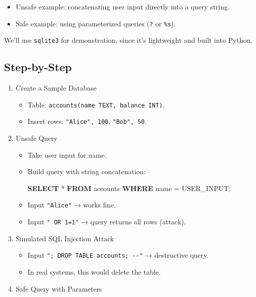 \documentclass[
  letterpaper,
  DIV=11,
  numbers=noendperiod]{scrreprt}
\newenvironment{Shaded}{\begin{snugshade}}{\end{snugshade}}
\newcommand{\KeywordTok}[1]{\textcolor[rgb]{0.00,0.23,0.31}{\textbf{#1}}}
\newcommand{\NormalTok}[1]{\textcolor[rgb]{0.00,0.23,0.31}{#1}}
\newcommand{\OperatorTok}[1]{\textcolor[rgb]{0.37,0.37,0.37}{#1}}
\newcommand{\StringTok}[1]{\textcolor[rgb]{0.13,0.47,0.30}{#1}}
\providecommand{\tightlist}{%
  \setlength{\itemsep}{0pt}\setlength{\parskip}{0pt}}
\begin{document}
\begin{itemize}
\tightlist
\item
  Unsafe example: concatenating user input directly into a query string.
\item
  Safe example: using parameterized queries (\texttt{?} or
  \texttt{\%s}).
\end{itemize}

We'll use \texttt{sqlite3} for demonstration, since it's lightweight and
built into Python.

\subsection{Step-by-Step}\label{step-by-step-14}

\begin{enumerate}
\def\labelenumi{\arabic{enumi}.}
\item
  Create a Sample Database

  \begin{itemize}
  \tightlist
  \item
    Table: \texttt{accounts(name\ TEXT,\ balance\ INT)}.
  \item
    Insert rows: \texttt{"Alice",\ 100}, \texttt{"Bob",\ 50}.
  \end{itemize}
\item
  Unsafe Query

  \begin{itemize}
  \item
    Take user input for name.
  \item
    Build query with string concatenation:

\begin{Shaded}
\begin{Highlighting}[]
\KeywordTok{SELECT} \OperatorTok{*} \KeywordTok{FROM}\NormalTok{ accounts }\KeywordTok{WHERE}\NormalTok{ name }\OperatorTok{=} \StringTok{\textquotesingle{}USER\_INPUT\textquotesingle{}}\NormalTok{;}
\end{Highlighting}
\end{Shaded}
  \item
    Input \texttt{"Alice"} → works fine.
  \item
    Input
    \texttt{"\textquotesingle{}\ OR\ \textquotesingle{}1\textquotesingle{}=\textquotesingle{}1"}
    → query returns all rows (attack).
  \end{itemize}
\item
  Simulated SQL Injection Attack

  \begin{itemize}
  \tightlist
  \item
    Input \texttt{";\ DROP\ TABLE\ accounts;\ -\/-"} → destructive
    query.
  \item
    In real systems, this would delete the table.
  \end{itemize}
\item
  Safe Query with Parameters


\end{enumerate}
\end{document}
